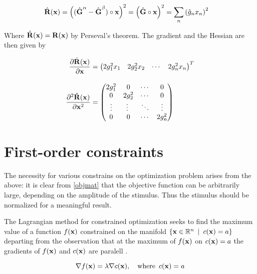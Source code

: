 \documentclass{article}
\newcommand{\R}{\mathbb{R}}
\newcommand{\vect}[1]{\textbf{\textrm{#1}}}
\newcommand{\pd}[2]{\frac{\partial {#1}}{\partial {#2}}}
\newcommand{\pdd}[2]{\frac{\partial^2 {#1}}{\partial {#2}}}
\begin{document}
\begin{align} \label{objmat}
	\hat{\vect{R}}(\vect{x}) & = \left( (\hat{\vect{G}}^\alpha - \hat{\vect{G}}^\beta) \circ 
						   		  \vect{x} \right)^2 = 
						   		  \left( \hat{\vect{G}} \circ  \vect{x} \right)^2 = 
						   		  \sum_n{\left( \hat{g}_n x_n \right)^2}
\end{align}

Where $\hat{\vect{R}}(\vect{x}) = \vect{R}(\vect{x})$ by Perseval's theorem.
The gradient and the Hessian are then given by

\begin{align}
	\pd{\hat{\vect{R}}(\vect{x})}{\vect{x}} & = 
	\begin{pmatrix}
		2 g_1^2 x_1 & 2 g_2^2 x_2 & \cdots & 2 g_n^2 x_n
	\end{pmatrix}^{T} \label{objgradient} \\[1em]
	\pdd{\hat{\vect{R}}(\vect{x})}{\vect{x}^2} & =
	\begin{pmatrix}
		2 g_1^2 & 0 & \cdots & 0 \\
		0 & 2 g_2^2 & \cdots & 0 \\
		\vdots & \vdots\ & \ddots & \vdots \\
		0 & 0 & \cdots & 2g_n^2
	\end{pmatrix} \label{objhessian}
\end{align}

\section{First-order constraints} \label{foc}
The necessity for various constrains on the optimization problem arises from the above: it is clear from \eqref{objmat} that the objective function can be arbitrarily large, depending on the amplitude of the stimulus. 
Thus the stimulus should be normalized for a meaningful result. \par
\hfill \newline
The Lagrangian method for constrained optimization seeks to find the maximum value of a function $f(\vect{x})$ constrained on the manifold $\lbrace \vect{x} \in \R^n \enspace | \enspace c(\vect{x}) = a \rbrace$ departing from the observation that at the maximum of $f(\vect{x})$ on $c(\vect{x}) = a$ the gradients of $f(\vect{x})$ and $c(\vect{x})$ are paralell \citep[ch.12]{nocedal2006}.

\begin{equation*}
	\nabla f(\vect{x}) = \lambda \nabla c(\vect{x}), \quad \text{where} \enspace c(\vect{x}) = a
\end{equation*}
\end{document}
